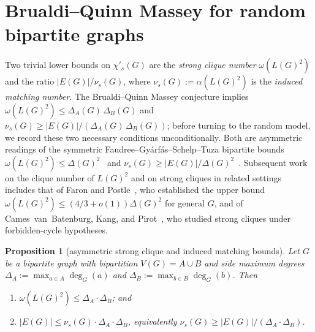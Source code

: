 \documentclass[11pt,a4paper]{article}
\newtheorem{proposition}[theorem]{Proposition}
\theoremstyle{definition}
\theoremstyle{remark}
\begin{document}
\section{Brualdi--Quinn Massey for random bipartite graphs}
\label{sec:random}

Two trivial lower bounds on $\chi'_s(G)$ are the \emph{strong clique
number} $\omega(L(G)^2)$ and the ratio $|E(G)|/\nu_s(G)$, where
$\nu_s(G) := \alpha(L(G)^2)$ is the \emph{induced matching number}. The
Brualdi--Quinn Massey conjecture implies
$\omega(L(G)^2) \leq \Delta_A(G)\,\Delta_B(G)$ and
$\nu_s(G) \geq |E(G)|/(\Delta_A(G)\,\Delta_B(G))$; before turning to the
random model, we record these two necessary conditions unconditionally.
Both are asymmetric readings of the symmetric
Faudree--Gy\'arf\'as--Schelp--Tuza bipartite bounds
$\omega(L(G)^2) \leq \Delta(G)^2$~\cite{faudreeStrongChromaticIndex1990}
and $\nu_s(G) \geq |E(G)|/\Delta(G)^2$~\cite{faudreeInducedMatchingsBipartite1989}.
Subsequent work on the clique number of $L(G)^2$ and on strong cliques
in related settings includes that of Faron and
Postle~\cite{faronPostleCliqueLineSquare2019}, who established the
upper bound $\omega(L(G)^2) \leq (4/3 + o(1))\Delta(G)^2$ for general
$G$, and of Cames~van~Batenburg, Kang, and
Pirot~\cite{camesvanBatenburgStrongCliques2019}, who studied strong
cliques under forbidden-cycle hypotheses.

\begin{proposition}[asymmetric strong clique and induced matching bounds]
\label{prop:asym-necessary}
Let $G$ be a bipartite graph with bipartition $V(G) = A \cup B$ and side
maximum degrees $\Delta_A := \max_{a \in A}\deg_G(a)$ and
$\Delta_B := \max_{b \in B}\deg_G(b)$. Then
\begin{enumerate}[label=\textup{(\alph*)}]
\item $\omega(L(G)^2) \leq \Delta_A \cdot \Delta_B$; and
\item $|E(G)| \leq \nu_s(G)\cdot\Delta_A\cdot\Delta_B$, equivalently
$\nu_s(G) \geq |E(G)|/(\Delta_A\cdot\Delta_B)$.
\end{enumerate}
\end{proposition}
\end{document}
